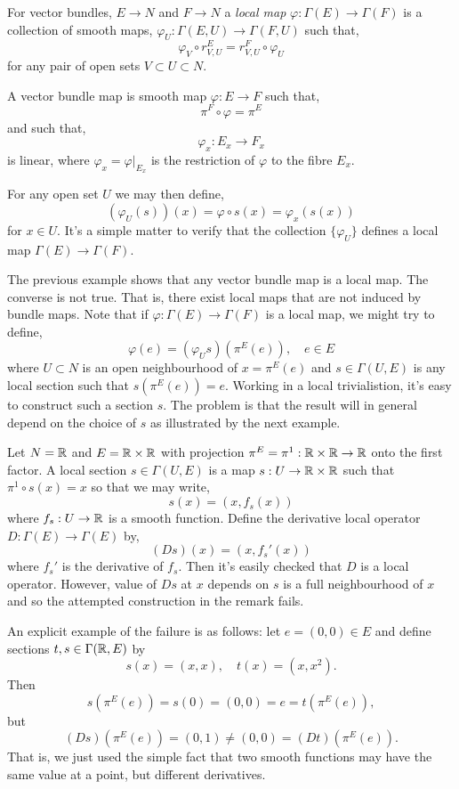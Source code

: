 \documentclass{amsart}
\begin{document}
\begin{defn}
For vector bundles, \(E \to N\) and \(F \to N\) a \emph{local map} \(\varphi : \Gamma(E) \to \Gamma(F)\) is a collection of smooth maps, \(\varphi_U : \Gamma(E, U) \to \Gamma(F, U)\) such that,
\[
\varphi_V \circ r^E_{V, U} = r^F_{V, U} \circ \varphi_U
\]
for any pair of open sets \(V \subset U \subset N\).
\end{defn}

\begin{example}
A vector bundle map is smooth map \(\varphi : E \to F\) such that,
\[
\pi^F \circ \varphi = \pi^E
\]
and such that,
\[
\varphi_x : E_x \to F_x
\]
is linear, where \(\varphi_x = \varphi|_{E_x}\) is the restriction of \(\varphi\) to the fibre \(E_x\).

For any open set \(U\) we may then define,
\[
(\varphi_U (s)) (x) = \varphi \circ s (x) = \varphi_x(s(x))
\]
for \(x \in U\). It's a simple matter to verify that the collection \(\{\varphi_U\}\) defines a local map \(\Gamma(E) \to \Gamma(F)\).
\end{example}

\begin{rem}
The previous example shows that any vector bundle map is a local map. The converse is not true. That is, there exist local maps that are not induced by bundle maps. Note that if \(\varphi : \Gamma(E) \to \Gamma(F)\) is a local map, we might try to define,
\[
\varphi(e) = (\varphi_U s) (\pi^E(e)), \quad e \in E
\]
where \(U \subset N\) is an open neighbourhood of \(x = \pi^E(e)\) and \(s \in \Gamma(U, E)\) is any local section such that \(s(\pi^E(e)) = e\). Working in a local trivialistion, it's easy to construct such a section \(s\). The problem is that the result will in general depend on the choice of \(s\) as illustrated by the next example.
\end{rem}

\begin{example}
Let \(N = \mathbb{R}\) and \(E = \mathbb{R} \times \mathbb{R}\) with projection \(\pi^E = \pi^1 : \mathbb{R} \times \mathbb{R} \to \mathbb{R}\) onto the first factor. A local section \(s \in \Gamma(U, E)\) is a map \(s : U \to \mathbb{R} \times \mathbb{R}\) such that \(\pi^1 \circ s (x) = x\) so that we may write,
\[
s(x) = (x, f_s(x))
\]
where \(f_s : U \to \mathbb{R}\) is a smooth function. Define the derivative local operator \(D : \Gamma(E) \to \Gamma(E)\) by,
\[
(D s) (x) = (x, f_s'(x))
\]
where \(f_s'\) is the derivative of \(f_s\). Then it's easily checked that \(D\) is a local operator. However, value of \(D s\) at \(x\) depends on \(s\) is a full neighbourhood of \(x\) and so the attempted construction in the remark fails.

An explicit example of the failure is as follows: let \(e = (0, 0) \in E\) and define sections \(t,s \in \Gamma(\mathbb{R}, E)\) by
\[
s(x) = (x, x), \quad t(x) = (x, x^2).
\]
Then
\[
s(\pi^E(e)) = s(0) = (0,0) = e = t(\pi^E(e)),
\]
but
\[
(D s) (\pi^E(e)) = (0, 1) \ne (0, 0) = (D t) (\pi^E(e)).
\]
That is, we just used the simple fact that two smooth functions may have the same value at a point, but different derivatives.
\end{example}
\end{document}

